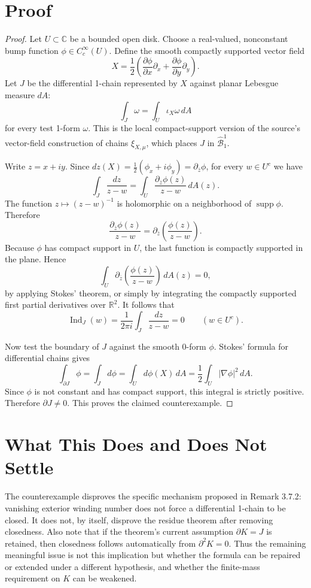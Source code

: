 \documentclass[11pt]{article}
\newcommand{\C}{\mathbb C}
\newcommand{\R}{\mathbb R}
\newcommand{\Bc}{\mathcal B}
\newcommand{\Ind}{\operatorname{Ind}}
\newcommand{\supp}{\operatorname{supp}}
\newcommand{\dbar}{\partial_{\bar z}}
\begin{document}
\section*{Proof}

\begin{proof}
Let \(U\subset\C\) be a bounded open disk.  Choose a real-valued, nonconstant
bump function \(\phi\in C_c^\infty(U)\).  Define the smooth compactly supported
vector field
\[
  X=\frac12\left(\frac{\partial\phi}{\partial x}\partial_x
      +\frac{\partial\phi}{\partial y}\partial_y\right).
\]
Let \(J\) be the differential 1-chain represented by \(X\) against planar
Lebesgue measure \(dA\):
\[
  \int_J \omega=\int_U \iota_X\omega\,dA
\]
for every test 1-form \(\omega\).  This is the local compact-support version
of the source's vector-field construction of chains \(\xi_{X,\mu}\), which
places \(J\) in \(\hat{\Bc}_1^1\).

Write \(z=x+iy\).  Since \(dz(X)=\frac12(\phi_x+i\phi_y)=\dbar\phi\), for every
\(w\in U^c\) we have
\[
  \int_J \frac{dz}{z-w}
  =
  \int_U \frac{\dbar\phi(z)}{z-w}\,dA(z).
\]
The function \(z\mapsto (z-w)^{-1}\) is holomorphic on a neighborhood of
\(\supp\phi\).  Therefore
\[
  \frac{\dbar\phi(z)}{z-w}
  =
  \dbar\left(\frac{\phi(z)}{z-w}\right).
\]
Because \(\phi\) has compact support in \(U\), the last function is compactly
supported in the plane.  Hence
\[
  \int_U \dbar\left(\frac{\phi(z)}{z-w}\right)\,dA(z)=0,
\]
by applying Stokes' theorem, or simply by integrating the compactly supported
first partial derivatives over \(\R^2\).  It follows that
\[
  \Ind_J(w)=\frac{1}{2\pi i}\int_J\frac{dz}{z-w}=0
  \qquad(w\in U^c).
\]

Now test the boundary of \(J\) against the smooth 0-form \(\phi\).  Stokes'
formula for differential chains gives
\[
  \int_{\partial J}\phi=\int_J d\phi
  =\int_U d\phi(X)\,dA
  =\frac12\int_U |\nabla\phi|^2\,dA.
\]
Since \(\phi\) is not constant and has compact support, this integral is
strictly positive.  Therefore \(\partial J\ne0\).  This proves the claimed
counterexample.
\end{proof}

\section*{What This Does and Does Not Settle}

The counterexample disproves the specific mechanism proposed in Remark 3.7.2:
vanishing exterior winding number does not force a differential 1-chain to be
closed.  It does not, by itself, disprove the residue theorem after removing
closedness.  Also note that if the theorem's current assumption
\(\partial K=J\) is retained, then closedness follows automatically from
\(\partial^2K=0\).  Thus the remaining meaningful issue is not this implication
but whether the formula can be repaired or extended under a different
hypothesis, and whether the finite-mass requirement on \(K\) can be weakened.
\end{document}
